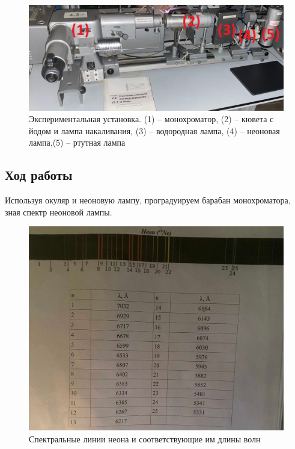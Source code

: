 \documentclass[a4paper,12pt]{article}
\begin{document}
\begin{figure} [h!]
	\centering
	\includegraphics[width=\linewidth]{setup}
	\caption{Экспериментальная установка. (1) -- монохроматор, (2) -- кювета с йодом и лампа накаливания, (3) -- водородная лампа, (4) -- неоновая лампа,(5) -- ртутная лампа}
\end{figure}

\subsection*{Ход работы}

Используя окуляр и неоновую лампу, проградуируем барабан монохроматора, зная спектр неоновой лампы.

\begin{figure}[h!]
	\centering
	\includegraphics[width=0.8\linewidth]{theor_neon_spectre}
	\caption{Спектральные линии неона и соответствующие им длины волн}
\end{figure}

\pagebreak
\end{document}
